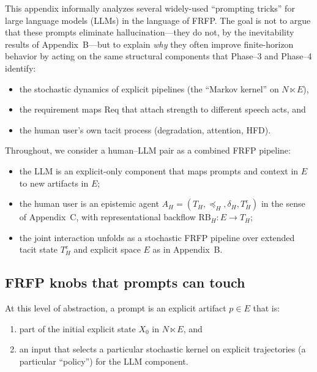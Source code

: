 
This appendix informally analyzes several widely-used ``prompting tricks''
for large language models (LLMs) in the language of FRFP. The goal is not to
argue that these prompts eliminate hallucination---they do not, by the
inevitability results of Appendix~B---but to explain \emph{why} they often
improve finite-horizon behavior by acting on the same structural components
that Phase--3 and Phase--4 identify:

\begin{itemize}
  \item the stochastic dynamics of explicit pipelines (the ``Markov kernel''
        on $N \ltimes E$),
  \item the requirement maps $\mathrm{Req}$ that attach strength to
        different speech acts, and
  \item the human user's own tacit process (degradation, attention, HFD).
\end{itemize}

Throughout, we consider a human--LLM pair as a combined FRFP pipeline:

\begin{itemize}
  \item the LLM is an explicit-only component that maps prompts and context
        in $E$ to new artifacts in $E$;
  \item the human user is an epistemic agent $A_H = (T_H,\preceq_H,\delta_H,T^e_H)$
        in the sense of Appendix~C, with representational backflow
        $\mathrm{RB}_H : E \to T_H$;
  \item the joint interaction unfolds as a stochastic FRFP pipeline over
        extended tacit state $T^e_H$ and explicit space $E$ as in Appendix~B.
\end{itemize}

\subsection{FRFP knobs that prompts can touch}

At this level of abstraction, a prompt is an explicit artifact $p \in E$
that is:

\begin{enumerate}
  \item part of the initial explicit state $X_0$ in $N \ltimes E$, and
  \item an input that selects a particular stochastic kernel on explicit
        trajectories (a particular ``policy'') for the LLM component.
\end{enumerate}

